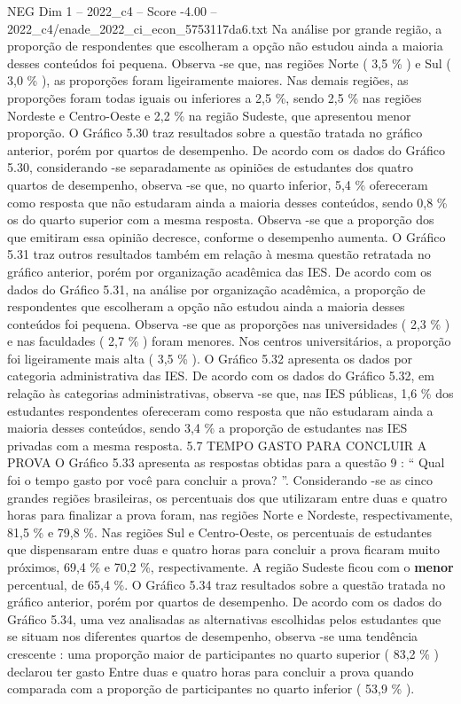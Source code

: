 \begin{textsample}{NEG Dim 1 – 2022\_c4 – Score -4.00 – 2022\_c4/enade\_2022\_ci\_econ\_5753117da6.txt}
Na análise por grande região, a proporção de respondentes que escolheram a opção não estudou ainda a maioria desses conteúdos foi pequena.
Observa -se que, nas regiões Norte ( 3,5 \% ) e Sul ( 3,0 \% ), as proporções foram ligeiramente maiores.
Nas demais regiões, as proporções foram todas iguais ou inferiores a 2,5 \%, sendo 2,5 \% nas regiões Nordeste e Centro-Oeste e 2,2 \% na região Sudeste, que apresentou menor proporção.
O Gráfico 5.30 traz resultados sobre a questão tratada no gráfico anterior, porém por quartos de desempenho.
De acordo com os dados do Gráfico 5.30, considerando -se separadamente as opiniões de estudantes dos quatro quartos de desempenho, observa -se que, no quarto inferior, 5,4 \% ofereceram como resposta que não estudaram ainda a maioria desses conteúdos, sendo 0,8 \% os do quarto superior com a mesma resposta.
Observa -se que a proporção dos que emitiram essa opinião decresce, conforme o desempenho aumenta.
O Gráfico 5.31 traz outros resultados também em relação à mesma questão retratada no gráfico anterior, porém por organização acadêmica das IES.
De acordo com os dados do Gráfico 5.31, na análise por organização acadêmica, a proporção de respondentes que escolheram a opção não estudou ainda a maioria desses conteúdos foi pequena.
Observa -se que as proporções nas universidades ( 2,3 \% ) e nas faculdades ( 2,7 \% ) foram menores.
Nos centros universitários, a proporção foi ligeiramente mais alta ( 3,5 \% ).
O Gráfico 5.32 apresenta os dados por categoria administrativa das IES.
De acordo com os dados do Gráfico 5.32, em relação às categorias administrativas, observa -se que, nas IES públicas, 1,6 \% dos estudantes respondentes ofereceram como resposta que não estudaram ainda a maioria desses conteúdos, sendo 3,4 \% a proporção de estudantes nas IES privadas com a mesma resposta. 5.7 TEMPO GASTO PARA CONCLUIR A PROVA O Gráfico 5.33 apresenta as respostas obtidas para a questão 9 : “ Qual foi o tempo gasto por você para concluir a prova? ”.
Considerando -se as cinco grandes regiões brasileiras, os percentuais dos que utilizaram entre duas e quatro horas para finalizar a prova foram, nas regiões Norte e Nordeste, respectivamente, 81,5 \% e 79,8 \%.
Nas regiões Sul e Centro-Oeste, os percentuais de estudantes que dispensaram entre duas e quatro horas para concluir a prova ficaram muito próximos, 69,4 \% e 70,2 \%, respectivamente.
A região Sudeste ficou com o \textbf{menor} percentual, de 65,4 \%.
O Gráfico 5.34 traz resultados sobre a questão tratada no gráfico anterior, porém por quartos de desempenho.
De acordo com os dados do Gráfico 5.34, uma vez analisadas as alternativas escolhidas pelos estudantes que se situam nos diferentes quartos de desempenho, observa -se uma tendência crescente : uma proporção maior de participantes no quarto superior ( 83,2 \% ) declarou ter gasto Entre duas e quatro horas para concluir a prova quando comparada com a proporção de participantes no quarto inferior ( 53,9 \% ).

\end{textsample}
